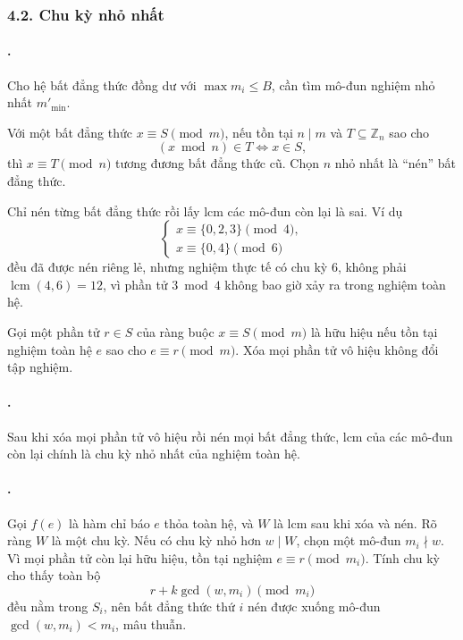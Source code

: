 \documentclass[11pt]{article}
\begin{document}
\subsubsection*{4.2. Chu kỳ nhỏ nhất}

\paragraph{.}
Cho hệ bất đẳng thức đồng dư với \(\max m_i\le B\), cần tìm mô-đun nghiệm nhỏ
nhất \(m'_{\min}\).

Với một bất đẳng thức \(x\equiv S\pmod m\), nếu tồn tại \(n\mid m\) và
\(T\subseteq\mathbb Z_n\) sao cho
\[
  (x\bmod n)\in T \Longleftrightarrow x\in S,
\]
thì \(x\equiv T\pmod n\) tương đương bất đẳng thức cũ. Chọn \(n\) nhỏ nhất là
``nén'' bất đẳng thức.

Chỉ nén từng bất đẳng thức rồi lấy lcm các mô-đun còn lại là sai. Ví dụ
\[
\begin{cases}
  x\equiv \{0,2,3\}\pmod 4,\\
  x\equiv \{0,4\}\pmod 6
\end{cases}
\]
đều đã được nén riêng lẻ, nhưng nghiệm thực tế có chu kỳ \(6\), không phải
\(\operatorname{lcm}(4,6)=12\), vì phần tử \(3\bmod 4\) không bao giờ xảy ra
trong nghiệm toàn hệ.

Gọi một phần tử \(r\in S\) của ràng buộc \(x\equiv S\pmod m\) là hữu hiệu nếu
tồn tại nghiệm toàn hệ \(e\) sao cho \(e\equiv r\pmod m\). Xóa mọi phần tử vô
hiệu không đổi tập nghiệm.

\paragraph{.}
Sau khi xóa mọi phần tử vô hiệu rồi nén mọi bất đẳng thức, lcm của các mô-đun
còn lại chính là chu kỳ nhỏ nhất của nghiệm toàn hệ.

\paragraph{.}
Gọi \(f(e)\) là hàm chỉ báo \(e\) thỏa toàn hệ, và \(W\) là lcm sau khi xóa và
nén. Rõ ràng \(W\) là một chu kỳ. Nếu có chu kỳ nhỏ hơn \(w\mid W\), chọn một
mô-đun \(m_i\nmid w\). Vì mọi phần tử còn lại hữu hiệu, tồn tại nghiệm
\(e\equiv r\pmod {m_i}\). Tính chu kỳ cho thấy toàn bộ
\[
  r+k\gcd(w,m_i)\pmod {m_i}
\]
đều nằm trong \(S_i\), nên bất đẳng thức thứ \(i\) nén được xuống mô-đun
\(\gcd(w,m_i)<m_i\), mâu thuẫn.
\end{document}
